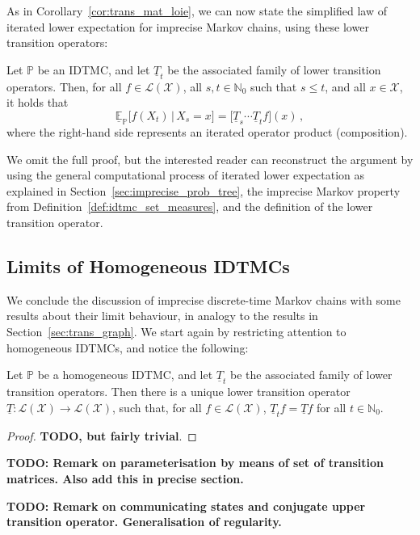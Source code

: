 \documentclass[graybox]{svmult}
\newcommand{\nats}{\mathbb{N}}
\newcommand{\natswith}{\nats_{0}}
\newcommand{\states}{\mathcal{X}}
\newcommand{\gambles}{\mathcal{L}}
\newcommand{\gamblesX}{\gambles(\states)}
\begin{document}
As in Corollary~\ref{cor:trans_mat_loie}, we can now state the simplified law of iterated lower expectation for imprecise Markov chains, using these lower transition operators:
\begin{theorem}
Let $\mathbb{P}$ be an IDTMC, and let $\underline{T}_t$ be the associated family of lower transition operators. Then, for all $f\in\gamblesX$, all $s,t\in\natswith$ such that $s\leq t$, and all $x\in\states$, it holds that
\begin{equation*}
\underline{\mathbb{E}}_\mathbb{P}\bigl[f(X_t)\,\big\vert\,X_s=x\bigr] = \bigl[\underline{T}_s\cdots \underline{T}_tf\bigr](x)\,,
\end{equation*}
where the right-hand side represents an iterated operator product (composition). 
\end{theorem}
We omit the full proof, but the interested reader can reconstruct the argument by using the general computational process of iterated lower expectation as explained in Section~\ref{sec:imprecise_prob_tree}, the imprecise Markov property from Definition~\ref{def:idtmc_set_measures}, and the definition of the lower transition operator.

\subsection{Limits of Homogeneous IDTMCs}

We conclude the discussion of imprecise discrete-time Markov chains with some results about their limit behaviour, in analogy to the results in Section~\ref{sec:trans_graph}. We start again by restricting attention to homogeneous IDTMCs, and notice the following:
\begin{proposition}
Let $\mathbb{P}$ be a homogeneous IDTMC, and let $\underline{T}_t$ be the associated family of lower transition operators. Then there is a unique lower transition operator $\underline{T}:\gamblesX\to\gamblesX$, such that, for all $f\in\gamblesX$, $\underline{T}_tf=\underline{T}f$ for all $t\in\natswith$.
\end{proposition}
\begin{proof}
{\bf TODO, but fairly trivial}.
\end{proof}

{\bf TODO: Remark on parameterisation by means of set of transition matrices. Also add this in precise section. }

{\bf TODO: Remark on communicating states and conjugate upper transition operator. Generalisation of regularity. }
\end{document}
